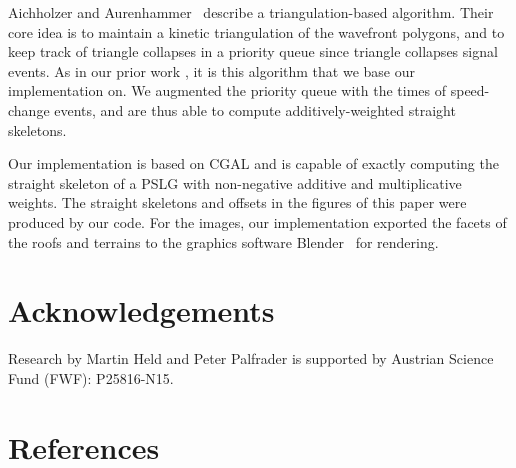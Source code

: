 \documentclass[preprint]{elsarticle}
\begin{document}
Aichholzer and Aurenhammer~\cite{AiAu98} describe a triangulation-based
algorithm. Their core idea is to maintain a kinetic
triangulation of the wavefront polygons, and to keep track of triangle
collapses in a priority queue since triangle collapses signal events.  As in
our prior work \cite{PalHH12}, it is this algorithm that we base our
implementation on.  We augmented the priority queue with the times of
speed-change events, and are thus able to compute additively-weighted
straight skeletons.

Our implementation is based on CGAL \cite{CGAL} and is capable of exactly
computing the straight skeleton of a PSLG with non-negative additive and
multiplicative weights. The straight skeletons and offsets in the figures of
this paper were produced by our code.  For the images, our implementation
exported the facets of the roofs and terrains to the graphics software
Blender~\cite{Blender} for rendering.

\section*{Acknowledgements}

Research by Martin Held and Peter Palfrader is supported by Austrian
Science Fund (FWF): P25816-N15.

\section*{References}


\end{document}

